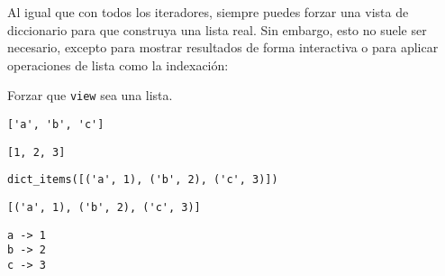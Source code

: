 Al igual que con todos los iteradores, siempre puedes forzar una vista
de diccionario para que construya una lista real. Sin embargo, esto no
suele ser necesario, excepto para mostrar resultados de forma
interactiva o para aplicar operaciones de lista como la indexación:
\\
\begin{code} Forzar que \texttt{view} sea una lista.
\begin{Shaded}
\begin{Highlighting}[]
\OperatorTok{=}
\end{Highlighting}
\end{Shaded}

\begin{verbatim}
['a', 'b', 'c']
\end{verbatim}

\begin{Shaded}
\begin{Highlighting}[]
\OperatorTok{=}
\end{Highlighting}
\end{Shaded}

\begin{verbatim}
[1, 2, 3]
\end{verbatim}

\begin{Shaded}
\begin{Highlighting}[]
\end{Highlighting}
\end{Shaded}

\begin{verbatim}
dict_items([('a', 1), ('b', 2), ('c', 3)])
\end{verbatim}

\begin{Shaded}
\begin{Highlighting}[]
\end{Highlighting}
\end{Shaded}

\begin{verbatim}
[('a', 1), ('b', 2), ('c', 3)]
\end{verbatim}

\begin{Shaded}
\begin{Highlighting}[]
    \NormalTok{(}\SpecialCharTok{\{}\SpecialCharTok{\}}\SpecialStringTok{ {-}\textgreater{} }\SpecialCharTok{\{}\SpecialCharTok{\}}\SpecialStringTok{\textquotesingle{}}\NormalTok{)}
\end{Highlighting}
\end{Shaded}

\begin{verbatim}
a -> 1
b -> 2
c -> 3

\end{verbatim}
\end{code}

